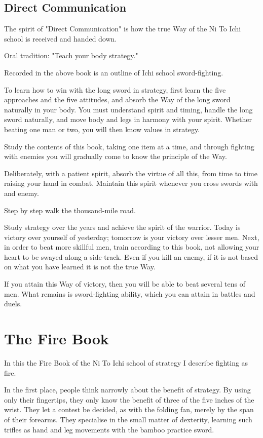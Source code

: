 \documentclass[12pt]{report}
\newcommand{\mychapter}[2]{
\setcounter{chapter}{#1}
    \setcounter{section}{0}
    \chapter*{#2}
    \addcontentsline{toc}{chapter}{#2}
}
\begin{document}
\section*{Direct Communication}
The spirit of "Direct Communication" is how the true Way of the Ni To Ichi school is received and handed down.

Oral tradition: "Teach your body strategy."

Recorded in the above book is an outline of Ichi school sword-fighting.

To learn how to win with the long sword in strategy, first learn the five approaches and the five attitudes, and absorb the Way of the long sword naturally in your body. You must understand spirit and timing, handle the long sword naturally, and move body and legs in harmony with your spirit. Whether beating one man or two, you will then know values in strategy.

Study the contents of this book, taking one item at a time, and through fighting with enemies you will gradually come to know the principle of the Way.

Deliberately, with a patient spirit, absorb the virtue of all this, from time to time raising your hand in combat. Maintain this spirit whenever you cross swords with and enemy.

Step by step walk the thousand-mile road.

Study strategy over the years and achieve the spirit of the warrior. Today is victory over yourself of yesterday; tomorrow is your victory over lesser men. Next, in order to beat more skillful men, train according to this book, not allowing your heart to be swayed along a side-track. Even if you kill an enemy, if it is not based on what you have learned it is not the true Way.

If you attain this Way of victory, then you will be able to beat several tens of men. What remains is sword-fighting ability, which you can attain in battles and duels.
\mychapter{4}{The Fire Book}
In this the Fire Book of the Ni To Ichi school of strategy I describe fighting as fire.

In the first place, people think narrowly about the benefit of strategy. By using only their fingertips, they only know the benefit of three of the five inches of the wrist. They let a contest be decided, as with the folding fan, merely by the span of their forearms. They specialise in the small matter of dexterity, learning such trifles as hand and leg movements with the bamboo practice sword.
\end{document}
